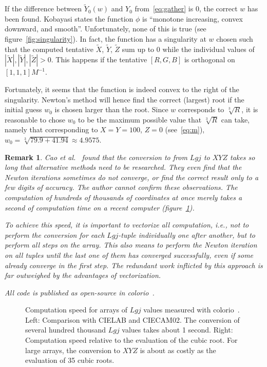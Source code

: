 \documentclass{scrartcl}
\newtheorem*{remark}{Remark}
\theoremstyle{named}
\begin{document}
If the difference between $\tilde{Y}_0(w)$ and $Y_0$ from~\eqref{eq:gather} is 0, the
correct $w$ has been found.  Kobayasi states the function $\phi$ is ``monotone
increasing, convex downward, and smooth''. Unfortunately, none of this is true (see
figure~\ref{fig:singularity}). In fact, the function has a singularity at $w$ chosen
such that the computed tentative $\tilde{X}$, $\tilde{Y}$, $\tilde{Z}$ sum up to 0 while
the individual values of $|\tilde{X}|, |\tilde{Y}|, |\tilde{Z}| > 0$. This happens if
the tentative $[R, G, B]$ is orthogonal on $[1,1,1] M^{-1}$.

Fortunately, it seems that the function is indeed convex to the right of the
singularity.  Newton's method will hence find the correct (largest) root if the initial
guess $w_0$ is chosen larger than the root. Since $w$ corresponds to $\sqrt[3]{R}$, it
is reasonable to chose $w_0$ to be the maximum possible value that $\sqrt[3]{R}$ can
take, namely that corresponding to $X=Y=100$, $Z=0$ (see~\eqref{eq:m}), $w_0=\sqrt[3]{79.9
+ 41.94}\approx 4.9575$.

\begin{remark}
  Cao et al.~\cite{cao} found that the conversion to from $Lgj$ to $XYZ$ takes so long
  that alternative methods need to be researched. They even find that the Newton
  iterations sometimes do not converge, or find the correct result only to a few digits
  of accuracy.  The author cannot confirm these observations. The computation of
  hundreds of thousands of coordinates at once merely takes a second of computation time
  on a recent computer (figure~\ref{fig:speed}).

  To achieve this speed, it is important to vectorize all computation, i.e., not to
  perform the conversion for each $Lgj$-tuple individually one after another, but to
  perform all steps on the array. This also means to perform the Newton iteration on all
  tuples until the last one of them has converged successfully, even if some already
  converge in the first step. The redundant work inflicted by this approach is far
  outweighed by the advantages of vectorization.

  All code is published as open-source in colorio~\cite{colorio}.
\end{remark}

\begin{figure}
  \centering
  \hfill
  
  \hfill
  
  \hfill
  \caption{Computation speed for arrays of $Lgj$ values measured with
  colorio~\cite{colorio}. Left: Comparison with CIELAB and CIECAM02.
  The conversion of several hundred thousand $Lgj$ values takes about 1 second. Right:
  Computation speed relative to the evaluation of the cubic root. For large arrays, the
  conversion to $XYZ$ is about as costly as the evaluation of 35 cubic roots.}\label{fig:speed}
\end{figure}

{}

\end{document}

